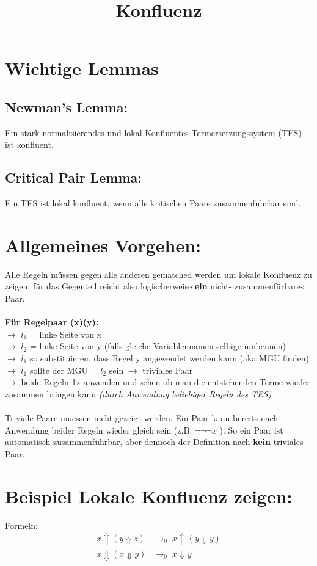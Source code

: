 \documentclass{article}
\title{Konfluenz}
\date{ }
\begin{document}
	\section*{Wichtige Lemmas}
		\subsection*{Newman's Lemma:}
			Ein stark normalisierendes und lokal Konfluentes Termersetzungssystem (TES) ist konfluent.
		\subsection*{Critical Pair Lemma:}
			Ein TES ist lokal konfluent, wenn alle kritischen Paare zusammenf\"uhrbar sind.
			
		\section*{Allgemeines Vorgehen:}
		Alle Regeln m\"ussen gegen alle anderen gematched werden um lokale Konfluenz zu 
		zeigen, f\"ur das Gegenteil reicht also logischerweise \textbf{ein} nicht- 
		zusammenf\"urbares Paar.\\\\
		
		\textbf{F\"ur Regelpaar (x)(y):}\\
		$\rightarrow$ $l_1$ = linke Seite von x\\
		$\rightarrow$ $l_2$ = linke Seite von y (falls gleiche Variablennamen selbige umbennen)\\
		$\rightarrow$ $l_1$ so substituieren, dass Regel y angewendet werden kann (aka MGU finden)\\
		$\rightarrow$ $l_1$ sollte der MGU = $l_2$ sein $\rightarrow$ triviales Paar\\
		$\rightarrow$ beide Regeln 1x anwenden und sehen ob man die entstehenden Terme wieder zusammen bringen kann 
		\textit{(durch Anwendung beliebiger Regeln des TES)}\\\\
		
		Triviale Paare muessen nicht gezeigt werden. Ein Paar kann bereits nach Anwendung beider Regeln wieder gleich sein
		(z.B. $\neg\neg\neg x$ ). So ein Paar ist automatisch zusammenf\"uhrbar, aber dennoch der Definition nach
		\textbf{\underline{kein}} triviales Paar.
		\section*{Beispiel Lokale Konfluenz zeigen:}
			Formeln:
			\begin{align}
				x \Uparrow ( y \Uparrow z) & \rightarrow_{0}
					\; x \Uparrow (y \Downarrow y)
				\\				
				x \Downarrow ( x \Downarrow y ) & \rightarrow_0
					\; x \Downarrow y
			\end{align}
			
\end{document}
